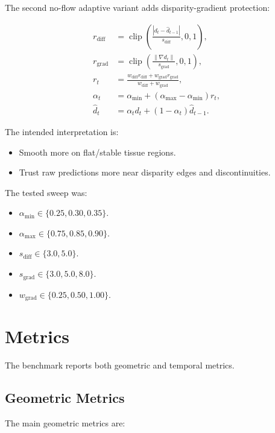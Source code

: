 \documentclass[11pt,a4paper]{article}
\begin{document}
The second no-flow adaptive variant adds disparity-gradient protection:

\begin{align}
    r_{\mathrm{diff}} &= \operatorname{clip}\left(\frac{|d_t - \hat{d}_{t-1}|}{s_{\mathrm{diff}}}, 0, 1\right),\\
    r_{\mathrm{grad}} &= \operatorname{clip}\left(\frac{\|\nabla d_t\|}{s_{\mathrm{grad}}}, 0, 1\right),\\
    r_t &= \frac{w_{\mathrm{diff}}r_{\mathrm{diff}} + w_{\mathrm{grad}}r_{\mathrm{grad}}}{w_{\mathrm{diff}} + w_{\mathrm{grad}}},\\
    \alpha_t &= \alpha_{\min} + (\alpha_{\max}-\alpha_{\min})r_t,\\
    \hat{d}_t &= \alpha_t d_t + (1-\alpha_t)\hat{d}_{t-1}.
\end{align}

The intended interpretation is:

\begin{itemize}[leftmargin=*]
    \item Smooth more on flat/stable tissue regions.
    \item Trust raw predictions more near disparity edges and discontinuities.
\end{itemize}

The tested sweep was:

\begin{itemize}[leftmargin=*]
    \item $\alpha_{\min} \in \{0.25,0.30,0.35\}$.
    \item $\alpha_{\max} \in \{0.75,0.85,0.90\}$.
    \item $s_{\mathrm{diff}} \in \{3.0,5.0\}$.
    \item $s_{\mathrm{grad}} \in \{3.0,5.0,8.0\}$.
    \item $w_{\mathrm{grad}} \in \{0.25,0.50,1.00\}$.
\end{itemize}

\section{Metrics}

The benchmark reports both geometric and temporal metrics.

\subsection{Geometric Metrics}

The main geometric metrics are:
\end{document}
